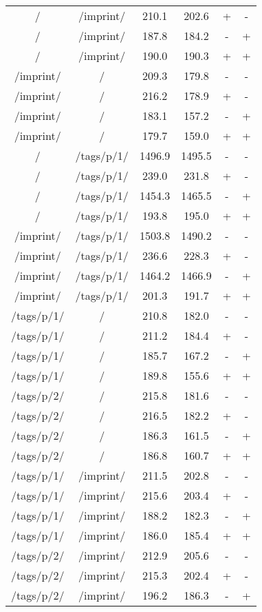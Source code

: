 \begin{appendix}
\begin{center}
\begin{longtable}{cccccc}
/ & /imprint/ & 210.1 & 202.6 & + & - \\
/ & /imprint/ & 187.8 & 184.2 & - & + \\
/ & /imprint/ & 190.0 & 190.3 & + & + \\
\hline
/imprint/ & / & 209.3 & 179.8 & - & - \\
/imprint/ & / & 216.2 & 178.9 & + & - \\
/imprint/ & / & 183.1 & 157.2 & - & + \\
/imprint/ & / & 179.7 & 159.0 & + & + \\
\hline
\hline
/ & /tags/p/1/ & 1496.9 & 1495.5 & - & - \\
/ & /tags/p/1/ & 239.0 & 231.8 & + & - \\
/ & /tags/p/1/ & 1454.3 & 1465.5 & - & + \\
/ & /tags/p/1/ & 193.8 & 195.0 & + & + \\
\hline
/imprint/ & /tags/p/1/ & 1503.8 & 1490.2 & - & - \\
/imprint/ & /tags/p/1/ & 236.6 & 228.3 & + & - \\
/imprint/ & /tags/p/1/ & 1464.2 & 1466.9 & - & + \\
/imprint/ & /tags/p/1/ & 201.3 & 191.7 & + & + \\
\hline
\hline
/tags/p/1/ & / & 210.8 & 182.0 & - & - \\
/tags/p/1/ & / & 211.2 & 184.4 & + & - \\
/tags/p/1/ & / & 185.7 & 167.2 & - & + \\
/tags/p/1/ & / & 189.8 & 155.6 & + & + \\
\hline
/tags/p/2/ & / & 215.8 & 181.6 & - & - \\
/tags/p/2/ & / & 216.5 & 182.2 & + & - \\
/tags/p/2/ & / & 186.3 & 161.5 & - & + \\
/tags/p/2/ & / & 186.8 & 160.7 & + & + \\
\hline
/tags/p/1/ & /imprint/ & 211.5 & 202.8 & - & - \\
/tags/p/1/ & /imprint/ & 215.6 & 203.4 & + & - \\
/tags/p/1/ & /imprint/ & 188.2 & 182.3 & - & + \\
/tags/p/1/ & /imprint/ & 186.0 & 185.4 & + & + \\
\hline
/tags/p/2/ & /imprint/ & 212.9 & 205.6 & - & - \\
/tags/p/2/ & /imprint/ & 215.3 & 202.4 & + & - \\
/tags/p/2/ & /imprint/ & 196.2 & 186.3 & - & + \\

\end{longtable}
\end{center}
\end{appendix}
